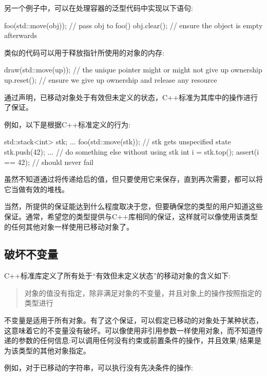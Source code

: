 另一个例子中，可以在处理容器的泛型代码中实现以下语句:

\begin{cppcode}
foo(std::move(obj)); // pass obj to foo()
obj.clear(); // ensure the object is empty afterwards
\end{cppcode}

类似的代码可以用于释放指针所使用的对象的内存:

\begin{cppcode}
draw(std::move(up)); // the unique pointer might or might not give up ownership
up.reset(); // ensure we give up ownership and release any resource
\end{cppcode}

通过声明，已移动对象处于有效但未定义的状态，C++标准为其库中的操作进行了保证。

例如，以下是根据C++标准定义的行为:

\begin{cppcode}
std::stack<int> stk;
...
foo(std::move(stk)); // stk gets unspecified state
stk.push(42);
... // do something else without using stk
int i = stk.top();
assert(i == 42); // should never fail
\end{cppcode}

虽然不知道通过将传递给后的值，但只要使用它来保存，直到再次需要，都可以将它当做有效的堆栈。

当然，所提供的保证能达到什么程度取决于您，但要确保您的类型的用户知道这些保证。通常，希望您的类型提供与C++库相同的保证，这样就可以像使用该类型的任何其他对象一样使用已移动对象了。

\subsection{破坏不变量}

C++标准库定义了所有处于“有效但未定义状态”的移动对象的含义如下:

\begin{quote}
	对象的值没有指定，除非满足对象的不变量，并且对象上的操作按照指定的类型进行
\end{quote}

不变量是适用于所有对象。有了这个保证，可以假定已移动的对象处于某种状态，这意味着它的不变量没有破坏。可以像使用非引用参数一样使用对象，而不知道传递的参数的任何信息:可以调用任何没有约束或前置条件的操作，并且效果/结果是为该类型的其他对象指定。

例如，对于已移动的字符串，可以执行没有先决条件的操作:

